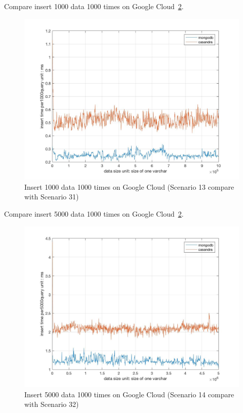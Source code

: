 Compare insert 1000 data 1000 times on Google Cloud~\ref{f:fly}.

\begin{figure}[!ht]
  \centering\includegraphics[width=\columnwidth]
  {images/insert_comp_1000_google.jpg}
  \caption{Insert 1000 data 1000 times on Google Cloud
   (Scenario 13 compare with Scenario 31)}\label{f:fly}
\end{figure}

Compare insert 5000 data 1000 times on Google Cloud~\ref{f:fly}.

\begin{figure}[!ht]
  \centering\includegraphics[width=\columnwidth]
  {images/insert_comp_5000_google.jpg}
  \caption{Insert 5000 data 1000 times on Google Cloud
  (Scenario 14 compare with Scenario 32)}\label{f:fly}
\end{figure}

